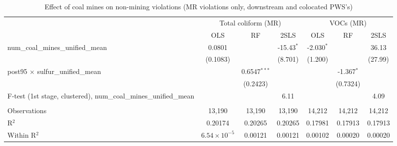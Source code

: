 
\begin{table}[htbp]
   
   \caption{\label{2sls_dwnstrmcolocate_nonminevio_mr} Effect of coal mines on non-mining violations (MR violations only, downstream and colocated PWS's)}
   \bigskip
   
   \centering
   
   \begin{adjustbox}{width = \textwidth, center}
      
      
      \begin{tabular}{lcccccc}
         \toprule
         
          & \multicolumn{3}{c}{Total coliform (MR)} & \multicolumn{3}{c}{VOCs (MR)}\\
         
                                                                            & OLS                   & RF             & 2SLS          & OLS           & RF            & 2SLS\\  
         
         \midrule 
         num\_coal\_mines\_unified\_mean                                    & 0.0801                &                & -15.43$^{*}$  & -2.030$^{*}$  &               & 36.13\\   
                                                                            & (0.1083)              &                & (8.701)       & (1.200)       &               & (27.99)\\   
         post95 $\times$ sulfur\_unified\_mean                              &                       & 0.6547$^{***}$ &               &               & -1.367$^{*}$  &   \\   
                                                                            &                       & (0.2423)       &               &               & (0.7324)      &   \\   
         
         F-test (1st stage, clustered), num\_coal\_mines\_unified\_mean     &                       &                & 6.11          &               &               & 4.09\\  
         
          \\
         
         Observations                                                       & 13,190                & 13,190         & 13,190        & 14,212        & 14,212        & 14,212\\  
         R$^2$                                                              & 0.20174               & 0.20265        & 0.20265       & 0.17981       & 0.17913       & 0.17913\\  
         Within R$^2$                                                       & $6.54\times 10^{-5}$  & 0.00121        & 0.00121       & 0.00102       & 0.00020       & 0.00020\\  
         

\end{tabular}
\end{adjustbox}
\end{table}
